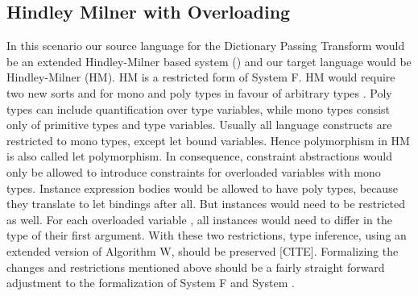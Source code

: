 \subsection{Hindley Milner with Overloading}
In this scenario our source language for the Dictionary Passing Transform would be an extended Hindley-Milner based system (\HMo) and our target language would be Hindley-Milner (HM). 
HM is a restricted form of System F. HM would require two new sorts  and  for mono and poly types in favour of arbitrary types . Poly types can include quantification over type variables, while mono types consist only of primitive types and type variables. 
Usually all language constructs are restricted to mono types, except let bound variables. 
Hence polymorphism in HM is also called let polymorphism.  
In consequence, constraint abstractions would only be allowed to introduce constraints for overloaded variables with mono types. Instance expression bodies would be allowed to have poly types, because they translate to let bindings after all.
But instances would need to be restricted as well. For each overloaded variable , all instances would need to differ in the type of their first argument.
With these two restrictions, type inference, using an extended version of Algorithm W, should be preserved [CITE]. Formalizing the changes and restrictions mentioned above should be a fairly straight forward adjustment to the formalization of System F and System \Fo.

